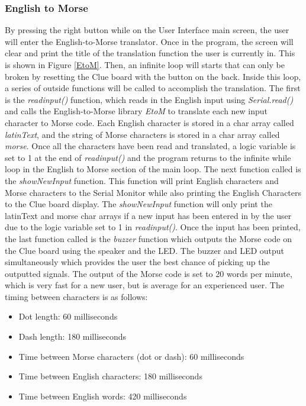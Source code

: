 \documentclass[12pt]{article}
\begin{document}
\subsubsection{English to Morse}
By pressing the right button while on the User Interface main screen, the user will enter the English-to-Morse translator. Once in the program, the screen will clear and print the title of the translation function the user is currently in. This is shown in Figure \ref{EtoM}. Then, an infinite loop will starts that can only be broken by resetting the Clue board with the button on the back. Inside this loop, a series of outside functions will be called to accomplish the translation. The first is the \emph{readinput()} function, which reads in the English input using \emph{Serial.read()} and calls the English-to-Morse library \emph{EtoM} to translate each new input character to Morse code. Each English character is stored in a char array called \emph{latinText}, and the string of Morse characters is stored in a char array called \emph{morse}. Once all the characters have been read and translated, a logic variable is set to 1 at the end of \emph{readinput()} and the program returns to the infinite while loop in the English to Morse section of the main loop. The next function called is the \emph{showNewInput} function. This function will print English characters and Morse characters to the Serial Monitor while also printing the English Characters to the Clue board display. The \emph{showNewInput} function will only print the latinText and morse char arrays if a new input has been entered in by the user due to the logic variable set to 1 in \emph{readinput()}. Once the input has been printed, the last function called is the \emph{buzzer} function which outputs the Morse code on the Clue board using the speaker and the LED. The buzzer and LED output simultaneously which provides the user the best chance of picking up the outputted signals. The output of the Morse code is set to 20 words per minute, which is very fast for a new user, but is average for an experienced user. The timing between characters is as follows:
\begin{itemize}
    \item Dot length: 60 milliseconds
    \item Dash length: 180 milliseconds
    \item Time between Morse characters (dot or dash): 60 milliseconds
    \item Time between English characters: 180 milliseconds
    \item Time between English words: 420 milliseconds
\end{itemize}
\end{document}

